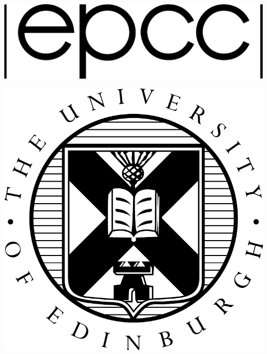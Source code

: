 \documentclass[]{article}
\date{}
\begin{document}
\begin{titlepage}

\begin{flushleft}
	\vspace*{-1cm}
	\includegraphics[scale=0.15]{logos/logo_black.pdf}\\
	\vspace*{1cm}
\end{flushleft}
\begin{flushright}
	\vspace*{-3cm}
	\includegraphics[scale=0.2]{logos/crest_bw.pdf}\\
	\vspace*{1cm}
\end{flushright}


\null


\end{titlepage}
\end{document}
